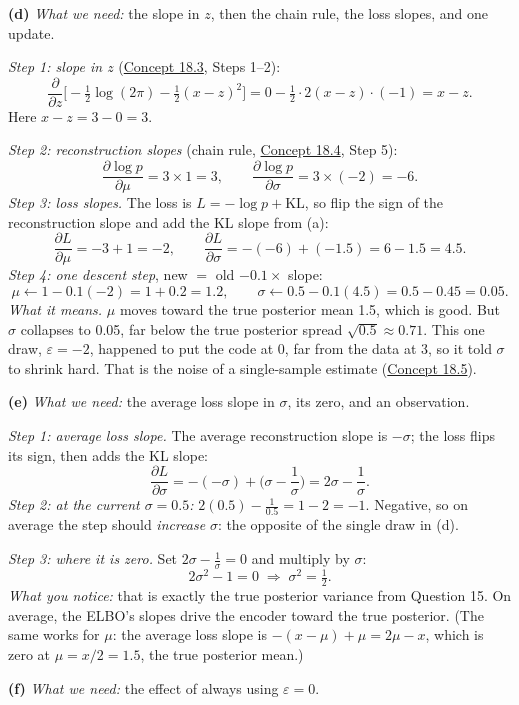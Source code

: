 \documentclass[12pt,a4paper]{article}
\begin{document}
\textbf{(d)} \emph{What we need:} the slope in $z$, then the chain rule, the loss slopes, and one update.

\emph{Step 1: slope in $z$} (\hyperref[c18-3]{Concept 18.3}, Steps 1--2):
\[
\frac{\partial}{\partial z}\Big[-\tfrac12\log(2\pi)-\tfrac12(x-z)^2\Big]=0-\tfrac12\cdot2(x-z)\cdot(-1)=x-z .
\]
Here $x-z=3-0=3$.

\emph{Step 2: reconstruction slopes} (chain rule, \hyperref[c18-4]{Concept 18.4}, Step 5):
\[
\frac{\partial\log p}{\partial\mu}=3\times1=3,\qquad\frac{\partial\log p}{\partial\sigma}=3\times(-2)=-6 .
\]
\emph{Step 3: loss slopes.} The loss is $L=-\log p+\mathrm{KL}$, so flip the sign of the reconstruction slope and add the KL slope from (a):
\[
\frac{\partial L}{\partial\mu}=-3+1=-2,\qquad\frac{\partial L}{\partial\sigma}=-(-6)+(-1.5)=6-1.5=4.5 .
\]
\emph{Step 4: one descent step}, new $=$ old $-0.1\times$ slope:
\[
\mu\leftarrow1-0.1(-2)=1+0.2=1.2,\qquad\sigma\leftarrow0.5-0.1(4.5)=0.5-0.45=0.05 .
\]
\emph{What it means.} $\mu$ moves toward the true posterior mean 1.5, which is good. But $\sigma$ collapses to 0.05, far below the true posterior spread $\sqrt{0.5}\approx0.71$. This one draw, $\varepsilon=-2$, happened to put the code at 0, far from the data at 3, so it told $\sigma$ to shrink hard. That is the noise of a single-sample estimate (\hyperref[c18-5]{Concept 18.5}).

\textbf{(e)} \emph{What we need:} the average loss slope in $\sigma$, its zero, and an observation.

\emph{Step 1: average loss slope.} The average reconstruction slope is $-\sigma$; the loss flips its sign, then adds the KL slope:
\[
\frac{\partial L}{\partial\sigma}=-(-\sigma)+\Big(\sigma-\frac1\sigma\Big)=2\sigma-\frac1\sigma .
\]
\emph{Step 2: at the current $\sigma=0.5$:} $2(0.5)-\frac{1}{0.5}=1-2=-1$. Negative, so on average the step should \emph{increase} $\sigma$: the opposite of the single draw in (d).

\emph{Step 3: where it is zero.} Set $2\sigma-\frac1\sigma=0$ and multiply by $\sigma$:
\[
2\sigma^2-1=0\;\Rightarrow\;\sigma^2=\tfrac12 .
\]
\emph{What you notice:} that is exactly the true posterior variance from Question 15. On average, the ELBO's slopes drive the encoder toward the true posterior. (The same works for $\mu$: the average loss slope is $-(x-\mu)+\mu=2\mu-x$, which is zero at $\mu=x/2=1.5$, the true posterior mean.)

\textbf{(f)} \emph{What we need:} the effect of always using $\varepsilon=0$.
\end{document}
